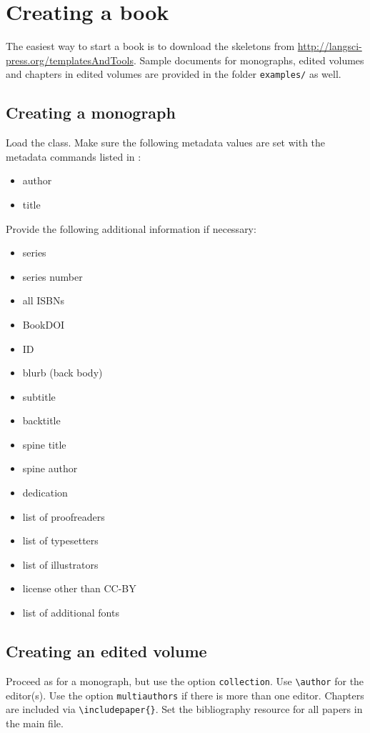 \documentclass[%
output=guidelines,guidelines]{langscibook}
\begin{document}
\chapter{Creating a book}
The easiest way to start a book is to download the skeletons from \url{http://langsci-press.org/templatesAndTools}. Sample documents for monographs, edited volumes and chapters in edited volumes are provided in the folder \texttt{examples/} as well.

\section{Creating a monograph}
Load the class. Make sure the following metadata values are set with the metadata commands listed in :

\begin{itemize}
 \item author
 \item title
\end{itemize}

Provide the following additional information if necessary:
\begin{itemize}
 \item series
 \item series number
 \item all ISBNs
 \item BookDOI
 \item ID
 \item blurb (back body)
 \item subtitle
 \item backtitle
 \item spine title
 \item spine author
 \item dedication
 \item list of proofreaders
 \item list of typesetters
 \item list of illustrators
 \item license other than CC-BY
 \item list of additional fonts
\end{itemize}


\section{Creating an edited volume}
Proceed as for a monograph, but use the option \texttt{collection}. Use \verb+\author+ for the editor(s). Use the option \texttt{multiauthors} if there is more than one editor.
Chapters are included via \verb+\includepaper{}+. Set the bibliography resource for all papers in the main file.
\end{document}
